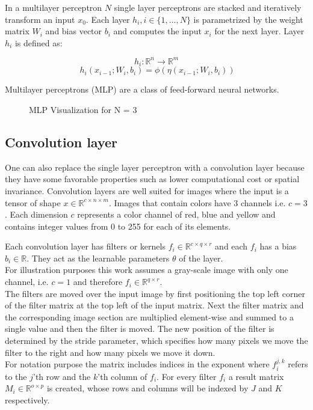 \documentclass{article}
\begin{document}
\noindent In a multilayer perceptron $N$ single layer perceptrons are stacked and iteratively transform an input $x_0$. 
Each layer $h_i, i \in \{1, ..., N\}$ is parametrized by the weight matrix $W_i$ and bias vector $b_i$ and computes
the input $x_i$ for the next layer. Layer $h_i$ is defined as:

\begin{equation}
    h_i: \mathbb{R}^n \xrightarrow{} \mathbb{R}^m
\end{equation}
\begin{equation*}\
    h_i(x_{i-1}; W_i, b_i) = \phi(\eta(x_{i-1}; W_i, b_i))
\end{equation*}
 
\noindent Multilayer perceptrons (MLP) are a class of feed-forward neural networks.
\begin{figure}[h]
  \centering
  
  \caption{MLP Visualization for N = 3}
\end{figure}

\subsection{Convolution layer}
\noindent One can also replace the single layer perceptron with a convolution layer because they have some
favorable properties such as lower computational cost or spatial invariance.
Convolution layers are well suited for images where the input is a tensor
of shape $x \in \mathbb{R}^{c \times n \times m}$. Images that contain colors have 3 channels i.e. $c = 3$.
Each dimension $c$ represents a color channel of red, blue and yellow and
contains integer values from 0 to 255 for each of its elements. 

\noindent Each convolution layer has filters or kernels $f_i \in \mathbb{R}^{c\times q \times r}$ and each $f_i$ has a bias $b_i \in \mathbb{R}$. They act as the learnable parameters $\theta$ of the layer.\\
For illustration purposes this work assumes a gray-scale image with only one channel, i.e. $c = 1$ and therefore $f_i \in \mathbb{R}^{q \times r}$.\\
The filters are moved over the input image by first positioning the top left corner of the filter matrix at the top left of the input matrix.
Next the filter matrix and the corresponding image section are multiplied element-wise and
summed to a single value and then the filter is moved.
The new position of the filter is determined by the stride parameter, which specifies how many pixels we move the filter to the right and how many pixels we move it down.\\
\noindent For notation purpose the matrix includes indices in the exponent where $f_i^{j,k}$ refers
to the $j$'th row and the $k$'th column of $f_i$. For every filter $f_i$ a result matrix $M_i \in \mathbb{R}^{o \times p}$ is
created, whose rows and columns will be indexed by $J$ and $K$ respectively. 
\end{document}

